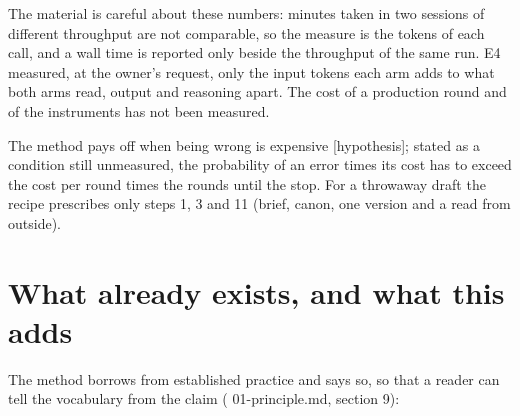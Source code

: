 \documentclass[
  american,
  10pt,
]{report}
\renewcommand{\texttt}[1]{{\ttfamily\hyphenchar\font=-1 #1}}
\begin{document}
The material is careful about these numbers: minutes taken in two
sessions of different throughput are not comparable, so the measure is
the tokens of each call, and a wall time is reported only beside the
throughput of the same run. E4 measured, at the owner's request, only
the input tokens each arm adds to what both arms read, output and
reasoning apart. The cost of a production round and of the instruments
has not been measured.

The method pays off when being wrong is expensive \texttt{[hypothesis]};
stated as a condition still unmeasured, the probability of an error
times its cost has to exceed the cost per round times the rounds until
the stop. For a throwaway draft the recipe prescribes only steps 1, 3
and 11 (brief, canon, one version and a read from outside).

\section{What already exists, and what this
adds}\label{what-already-exists-and-what-this-adds}

The method borrows from established practice and says so, so that a
reader can tell the vocabulary from the claim
(\texttt{01-\allowbreak{}principle.\allowbreak{}md}, section 9):
\end{document}
